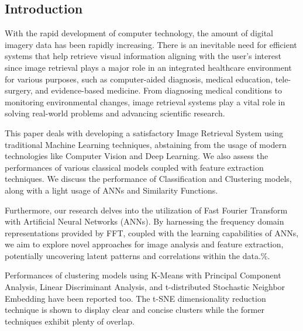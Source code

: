 \documentclass[a4paper]{article}
\theoremstyle{plain}
\theoremstyle{definition}
\begin{document}
\subsection {Introduction}
\noindent With the rapid development of computer technology, the amount of digital imagery data has been rapidly increasing. There is an inevitable need for efficient systems that help retrieve visual information aligning with the user's interest since image retrieval plays a major role in an integrated healthcare environment for various purposes, such as computer-aided diagnosis, medical education, tele-surgery, and evidence-based medicine. From diagnosing medical conditions to monitoring environmental changes, image retrieval systems play a vital role in solving real-world problems and advancing scientific research.
\newline

\noindent This paper deals with developing a satisfactory Image Retrieval System using traditional Machine Learning techniques, abstaining from the usage of modern technologies like Computer Vision and Deep Learning. We also assess the performances of various classical models coupled with feature extraction techniques. We discuss the performance of Classification and Clustering models, along with a light usage of ANNs and Similarity Functions. %
\newline
        
    

\noindent Furthermore, our research delves into the utilization of Fast Fourier Transform with Artificial Neural Networks (ANNs). By harnessing the frequency domain representations provided by FFT, coupled with the learning capabilities of ANNs, we aim to explore novel approaches for image analysis and feature extraction, potentially uncovering latent patterns and correlations within the data.\%.
\newline
    
\noindent Performances of clustering models using K-Means with Principal Component Analysis, Linear Discriminant Analysis, and t-distributed Stochastic Neighbor Embedding have been reported too. The t-SNE dimensionality reduction technique is shown to display clear and concise clusters while the former techniques exhibit plenty of overlap. 
\newline
    
\end{document}
